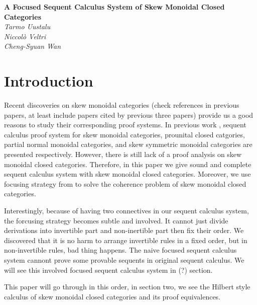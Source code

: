 \documentclass{article}
\begin{document}
\begin{titlepage}
   \begin{center}
      \Large\textbf{A Focused Sequent Calculus System of Skew Monoidal Closed Categories}\\
      \large\textit{Tarmo Uustalu}\\
      \large\textit{Niccol\`o Veltri}\\
      \large\textit{Cheng-Syuan Wan}
   \end{center}
\end{titlepage}
\section{Introduction}
Recent discoveries on skew monoidal categories \cite{szlachanyi_skew-monoidal_2012} \cite{street_skew-closed_2013} \cite{lack_triangulations_2014} (check references in previous papers, at least include papers cited by previous three papers) provide us a good reasons to study their corresponding proof systems.
In previous work \cite{uustalu_sequent_2018} \cite{uustalu_deductive_nodate} \cite{uustalu_proof_nodate} \cite{veltri_coherence_2021}, sequent calculus proof system for skew monoidal categories, prounital closed catgories, partial normal monoidal categories, and skew symmetric monoidal categories are presented respectively.
However, there is still lack of a proof analysis on skew monoidal closed categories.
Therefore, in this paper we give sound and complete sequent calculus system with skew monoidal closed categories.
Moreover, we use focusing strategy from \cite{andreoli_logic_1992} to solve the coherence problem of skew monoidal closed categories.

Interestingly, because of having two connectives in our sequent calculus system, the forcusing strategy becomes subtle and involved.
It cannot just divide derivations into invertible part and non-inertible part then fix their order.
We discovered that it is no harm to arrange invertible rules in a fixed order, but in non-invertible rules, bad thing happens.
The naive focused sequent calculus system cannont prove some provable sequents in original sequent calculus.
We will see this involved focused sequent calculus system in (?) section.

This paper will go through in this order, in section two, we see the Hilbert style calculus of skew monoidal closed categories and its proof equivalences.
\end{document}
